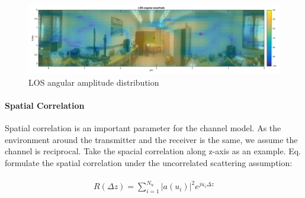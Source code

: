 \documentclass[a4paper]{article}
\begin{document}
    \begin{figure}[h]
		\centering
		\includegraphics[scale=0.42]{figures/LOS_angular.png}
		\vspace{-0.2cm}
		\centering
		\caption{LOS angular amplitude distribution}
		\label{fig:angular_los}
	\end{figure}
	
    \paragraph{Spatial Correlation}
    Spatial correlation is an important parameter for the channel model. As the environment around the transmitter and the receiver is the same, we assume the channel is reciprocal. Take the spacial correlation along z-axis as an example. Eq. formulate the spatial correlation under the uncorrelated scattering assumption:
    
    \begin{align} 
		\begin{split}
			R(\Delta z) = \sum_{i=1}^{N_u} |a(u_i)|^2 e^{ju_i\Delta z}
		\end{split}
		\label{eq:spatialCorr}
	\end{align}
    
\end{document}
